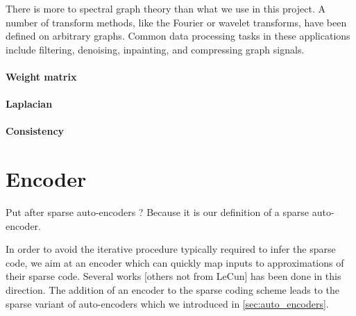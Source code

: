 
There is more to spectral graph theory than what we use in this project. A number of transform methods, like the Fourier or wavelet transforms, have been defined on arbitrary graphs. Common data processing tasks in these applications include filtering, denoising, inpainting, and compressing graph signals.

\paragraph{Weight matrix}

\paragraph{Laplacian}

\paragraph{Consistency}

\section{Encoder} \label{sec:encoder}
{\color{red} Put after sparse auto-encoders ? Because it is our definition of a sparse auto-encoder.}

In order to avoid the iterative procedure typically required to infer the sparse code, we aim at an encoder which can quickly map inputs to approximations of their sparse code. Several works \cite{lecun2010PSD, lecun2010LISTA, lecun2013DrSAE} {\color{red} [others not from LeCun]} has been done in this direction. The addition of an encoder to the sparse coding scheme leads to the sparse variant of auto-encoders which we introduced in \ref{sec:auto_encoders}.

